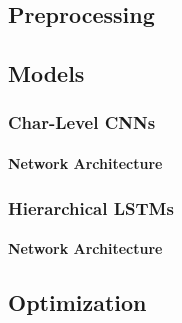\subsection{Preprocessing}

\subsection{Models}
\subsubsection{Char-Level CNNs}
\paragraph*{Network Architecture}
\subsubsection{Hierarchical LSTMs}
\paragraph*{Network Architecture}
\subsection{Optimization}